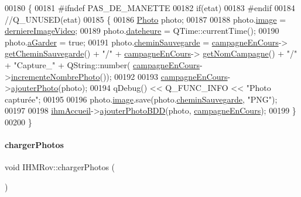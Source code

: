 \begin{DoxyCode}
00180 \{
00181 \textcolor{preprocessor}{    #ifndef PAS\_DE\_MANETTE}
00182     \textcolor{keywordflow}{if}(etat)
00183 \textcolor{preprocessor}{    #endif}
00184     \textcolor{comment}{//Q\_UNUSED(etat)}
00185     \{        
00186         \hyperlink{struct_photo}{Photo} photo;
00187 
00188         photo.\hyperlink{struct_photo_aa6ecfed8082bea5af2905208308a6adb}{image} = \hyperlink{class_i_h_m_rov_a2081e30323773ee895199ec026d82fc8}{derniereImageVideo};
00189         photo.\hyperlink{struct_photo_a0ac4d5bba2d119ca73ba949d18a557bd}{dateheure} = QTime::currentTime();
00190         photo.\hyperlink{struct_photo_afec1baefdd7d036432494bbb33b21366}{aGarder} = \textcolor{keyword}{true};
00191         photo.\hyperlink{struct_photo_a3c28eb9ad160b65deb46a72146a1d14f}{cheminSauvegarde} = \hyperlink{class_i_h_m_rov_af0475e935531b7331f097ae13d07989b}{campagneEnCours}->
      \hyperlink{class_campagne_ad752790357417d83a93056d9c9689a16}{getCheminSauvegarde}() + \textcolor{stringliteral}{"/"} + \hyperlink{class_i_h_m_rov_af0475e935531b7331f097ae13d07989b}{campagneEnCours}->
      \hyperlink{class_campagne_a99a682fcb8e5a3f8c2aff7a44eb2c930}{getNomCampagne}() + \textcolor{stringliteral}{"/"} + \textcolor{stringliteral}{"Capture\_"} + QString::number(
      \hyperlink{class_i_h_m_rov_af0475e935531b7331f097ae13d07989b}{campagneEnCours}->\hyperlink{class_campagne_ab6a893a28bc18e054d2d19d2671ce6da}{incrementeNombrePhoto}());
00192 
00193         \hyperlink{class_i_h_m_rov_af0475e935531b7331f097ae13d07989b}{campagneEnCours}->\hyperlink{class_campagne_a472029bf46646d136a750dbaa7a3155f}{ajouterPhoto}(photo);
00194         qDebug() << Q\_FUNC\_INFO << \textcolor{stringliteral}{"Photo capturée"};
00195 
00196         photo.\hyperlink{struct_photo_aa6ecfed8082bea5af2905208308a6adb}{image}.save(photo.\hyperlink{struct_photo_a3c28eb9ad160b65deb46a72146a1d14f}{cheminSauvegarde}, \textcolor{stringliteral}{"PNG"});
00197 
00198         \hyperlink{class_i_h_m_rov_aa22f6fe8daf5c67071ec02a348e5cc3e}{ihmAccueil}->\hyperlink{class_i_h_m_accueil_aa27c7334efe44c8c4cd582df6581fdff}{ajouterPhotoBDD}(photo, 
      \hyperlink{class_i_h_m_rov_af0475e935531b7331f097ae13d07989b}{campagneEnCours});
00199     \}
00200 \}
\end{DoxyCode}
\mbox{\label{class_i_h_m_rov_aae5c264f7a1b6d27c1d2e25574c88c5b}} 
\paragraph{\texorpdfstring{charger\+Photos}{chargerPhotos}}
{\footnotesize\ttfamily void I\+H\+M\+Rov\+::charger\+Photos (\begin{DoxyParamCaption}{ }\end{DoxyParamCaption})\hspace{0.3cm}{\ttfamily [slot]}}



